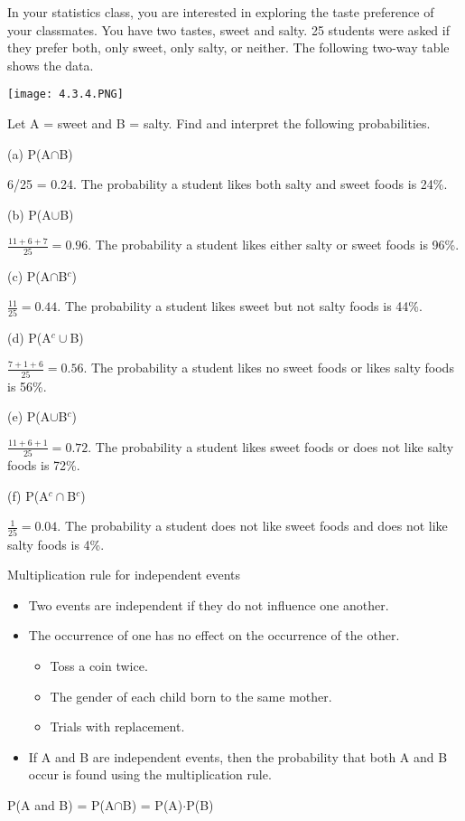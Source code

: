 \documentclass[../stats.tex]{subfiles}
\begin{document}
\begin{example}
    In your statistics class, you are interested in exploring the taste preference of your classmates. You have two tastes, sweet and salty. 25 students were asked if they prefer both, only sweet, only salty, or neither. The following two-way table shows the data.
    \begin{center}
        \texttt{[image: 4.3.4.PNG]}
    \end{center}

    Let A = sweet and B = salty. Find and interpret the following probabilities.

    (a) P(A$\cap$B)

    6/25 = 0.24. The probability a student likes both salty and sweet foods is 24\%.

    (b) P(A$\cup$B)

    $\frac{11+6+7}{25}=0.96$. The probability a student likes either salty or sweet foods is 96\%.

    (c) P(A$\cap$B$^c$)

    $\frac{11}{25}=0.44$. The probability a student likes sweet but not salty foods is 44\%.

    (d) P(A$^c\cup$B)

    $\frac{7+1+6}{25}=0.56$. The probability a student likes no sweet foods or likes salty foods is 56\%.

    (e) P(A$\cup$B$^c$)

    $\frac{11+6+1}{25}=0.72$. The probability a student likes sweet foods or does not like salty foods is 72\%.

    (f) P(A$^c\cap$B$^c$)

    $\frac{1}{25}=0.04$. The probability a student does not like sweet foods and does not like salty foods is 4\%.
\end{example}

Multiplication rule for independent events
\begin{itemize}
    \item Two events are independent if they do not influence one another.
    \item The occurrence of one has no effect on the occurrence of the other.
    \begin{itemize}
        \item Toss a coin twice.
        \item The gender of each child born to the same mother.
        \item Trials with replacement.
    \end{itemize}\pagebreak
    \item If A and B are independent events, then the probability that both A and B occur is found using the multiplication rule.
\end{itemize}
\begin{center}
    P(A and B) = P(A$\cap$B) = P(A)$\cdot$P(B)
\end{center}
\end{document}
